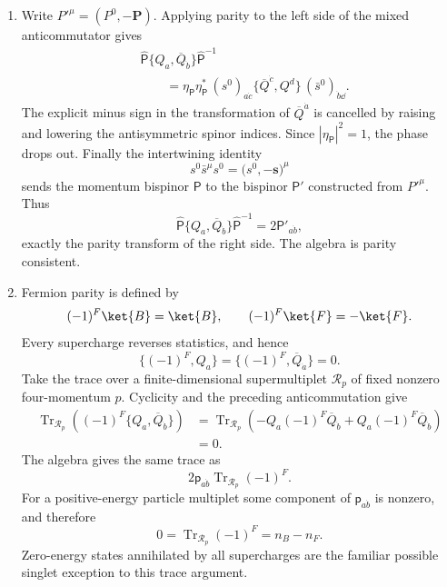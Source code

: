 \begin{enumerate}
\begin{enumerate}
    \item Write \(P'^\mu=(P^0,-\boldsymbol P)\).  Applying parity to the
      left side of the mixed anticommutator gives
      \[
      \begin{aligned}
        &\widehat{\mathsf P}
          \{Q_a,\overline Q_{\dot b}\}
          \widehat{\mathsf P}^{-1}\\
        &\qquad
          =\eta_{\mathsf P}\eta_{\mathsf P}^{*}
            \,(s^0)_{a\dot c}
            \{\overline Q^{\dot c},Q^d\}
            \,(\bar s^0)_{\dot b \dd}.
      \end{aligned}
      \]
      The explicit minus sign in the transformation of
      \(\overline Q^{\dot a}\) is cancelled by raising and lowering the
      antisymmetric spinor indices.  Since
      \(|\eta_{\mathsf P}|^2=1\), the phase drops out.  Finally the
      intertwining identity
      \[
        s^0\bar s^\mu s^0
          =\bigl(s^0,-\boldsymbol s\bigr)^\mu
      \]
      sends the momentum bispinor \(\mathsf P\) to the bispinor
      \(\mathsf P'\) constructed from \(P'^\mu\).  Thus
      \[
        \widehat{\mathsf P}
          \{Q_a,\overline Q_{\dot b}\}
          \widehat{\mathsf P}^{-1}
          =2\mathsf P'_{a\dot b},
      \]
      exactly the parity transform of the right side.  The algebra is
      parity consistent.

    \item Fermion parity is defined by
      \[
        (-1)^F\ket{B}=\ket{B},
        \qquad
        (-1)^F\ket{F}=-\ket{F}.
      \]
      Every supercharge reverses statistics, and hence
      \[
        \{(-1)^F,Q_a\}
          =\{(-1)^F,\overline Q_{\dot a}\}=0.
      \]
      Take the trace over a finite-dimensional supermultiplet
      \(\mathcal R_p\) of fixed nonzero four-momentum \(p\).  Cyclicity
      and the preceding anticommutation give
      \[
      \begin{aligned}
        \operatorname{Tr}_{\mathcal R_p}
          \left((-1)^F\{Q_a,\overline Q_{\dot b}\}\right)
          &=
          \operatorname{Tr}_{\mathcal R_p}
          \left(-Q_a(-1)^F\overline Q_{\dot b}
                 +Q_a(-1)^F\overline Q_{\dot b}\right)\\
          &=0.
      \end{aligned}
      \]
      The algebra gives the same trace as
      \[
        2\mathsf p_{a\dot b}
          \operatorname{Tr}_{\mathcal R_p}(-1)^F.
      \]
      For a positive-energy particle multiplet some component of
      \(\mathsf p_{a\dot b}\) is nonzero, and therefore
      \[
        0=\operatorname{Tr}_{\mathcal R_p}(-1)^F
          =n_B-n_F.
      \]
      Zero-energy states annihilated by all supercharges are the familiar
      possible singlet exception to this trace argument.


\end{enumerate}
\end{enumerate}

